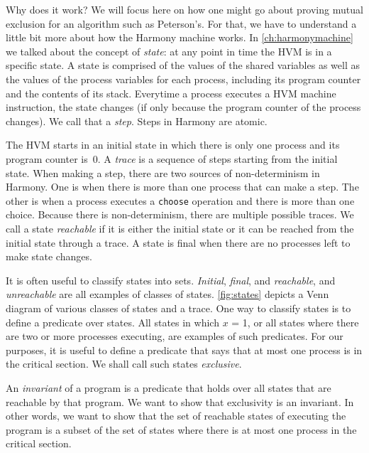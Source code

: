 \documentclass{report}
\begin{document}
%
%

Why does it work?  We will focus here on how one might go about proving
mutual exclusion for an algorithm such as Peterson's.
For that, we have to understand a little bit more about how the Harmony
machine works.
In \autoref{ch:harmonymachine} we talked about the concept of \emph{state}:
%
at any point in time the HVM is in a specific state.
A state is comprised of the values of the shared variables as well as
the values of the process variables
%
for each process, including its
program counter and the contents of its stack.
Everytime a process executes a HVM machine instruction, the
state changes (if only because the program counter of the process
changes).  We call that a \emph{step}.
%
Steps in Harmony are atomic.

%
%

The HVM starts in an initial state in which there is only
one process and its program counter is~0.  A \emph{trace}
%
is a sequence of steps starting from the initial state.
When making a step, there are two sources of non-determinism
%
in Harmony.
One is when
there is more than one process that can make a step.  The other is
when a process executes a \texttt{choose} operation and there is
more than one choice.
Because there is non-determinism, there are multiple possible traces.
We call a state \emph{reachable}
%
if it is either the initial state
or it can be reached from the initial state through a trace.
A state is final
when there are no processes left to make state changes.

It is often useful to classify states into sets.
\emph{Initial}, \emph{final}, and \emph{reachable}, and \emph{unreachable}
are all examples of classes of states.
\autoref{fig:states} depicts a Venn diagram of various classes of states
and a trace.
One way to classify states is to define a predicate over states.
All states in which $x$ = 1, or all states where
there are two or more processes executing, are examples of such predicates.
For our purposes, it is useful to define a predicate that says that at
most one process is in the critical section.  We shall call such states
\emph{exclusive}.

An \emph{invariant} of a program
%
is a predicate that holds over all states that are reachable by that program.
We want to show that exclusivity is an invariant.
In other words, we want to show that the set of reachable states of executing
the program
is a subset of the set of states where there is at most one process in the critical
section.
\end{document}
